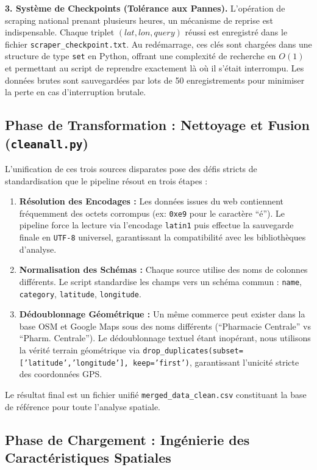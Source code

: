 \documentclass[11pt,a4paper,twoside]{report}
\begin{document}
\textbf{3. Système de Checkpoints (Tolérance aux Pannes).} L'opération de scraping national prenant plusieurs heures, un mécanisme de reprise est indispensable. Chaque triplet $(lat, lon, query)$ réussi est enregistré dans le fichier \texttt{scraper\_checkpoint.txt}. Au redémarrage, ces clés sont chargées dans une structure de type \texttt{set} en Python, offrant une complexité de recherche en $O(1)$ et permettant au script de reprendre exactement là où il s'était interrompu. Les données brutes sont sauvegardées par lots de 50 enregistrements pour minimiser la perte en cas d'interruption brutale.

\subsection{Phase de Transformation : Nettoyage et Fusion (\texttt{cleanall.py})}

L'unification de ces trois sources disparates pose des défis stricts de standardisation que le pipeline résout en trois étapes :

\begin{enumerate}
    \item \textbf{Résolution des Encodages :} Les données issues du web contiennent fréquemment des octets corrompus (ex: \texttt{0xe9} pour le caractère ``é''). Le pipeline force la lecture via l'encodage \texttt{latin1} puis effectue la sauvegarde finale en \texttt{UTF-8} universel, garantissant la compatibilité avec les bibliothèques d'analyse.
    \item \textbf{Normalisation des Schémas :} Chaque source utilise des noms de colonnes différents. Le script standardise les champs vers un schéma commun : \texttt{name}, \texttt{category}, \texttt{latitude}, \texttt{longitude}.
    \item \textbf{Dédoublonnage Géométrique :} Un même commerce peut exister dans la base OSM et Google Maps sous des noms différents (``Pharmacie Centrale'' vs ``Pharm. Centrale''). Le dédoublonnage textuel étant inopérant, nous utilisons la vérité terrain géométrique via \texttt{drop\_duplicates(subset=['latitude','longitude'], keep='first')}, garantissant l'unicité stricte des coordonnées GPS.
\end{enumerate}

Le résultat final est un fichier unifié \texttt{merged\_data\_clean.csv} constituant la base de référence pour toute l'analyse spatiale.

\subsection{Phase de Chargement : Ingénierie des Caractéristiques Spatiales}
\end{document}
